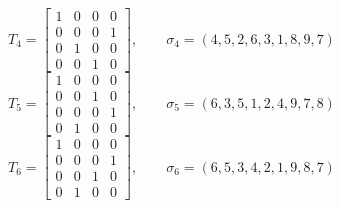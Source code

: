 \documentclass[11pt,a4paper]{article}
\begin{document}
\begin{equation*}
T_{4} = \begin{bmatrix}
1 & 0 & 0 & 0 \\
0 & 0 & 0 & 1 \\
0 & 1 & 0 & 0 \\
0 & 0 & 1 & 0
\end{bmatrix}, \qquad \sigma_{4} = (4, 5, 2, 6, 3, 1, 8, 9, 7)
\end{equation*}
\begin{equation*}
T_{5} = \begin{bmatrix}
1 & 0 & 0 & 0 \\
0 & 0 & 1 & 0 \\
0 & 0 & 0 & 1 \\
0 & 1 & 0 & 0
\end{bmatrix}, \qquad \sigma_{5} = (6, 3, 5, 1, 2, 4, 9, 7, 8)
\end{equation*}
\begin{equation*}
T_{6} = \begin{bmatrix}
1 & 0 & 0 & 0 \\
0 & 0 & 0 & 1 \\
0 & 0 & 1 & 0 \\
0 & 1 & 0 & 0
\end{bmatrix}, \qquad \sigma_{6} = (6, 5, 3, 4, 2, 1, 9, 8, 7)
\end{equation*}
\end{document}
